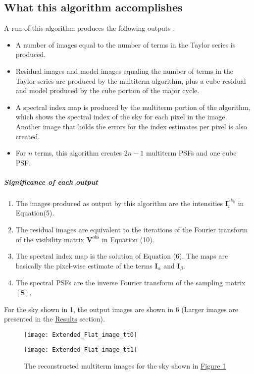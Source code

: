 \documentclass{article}
\begin{document}
\subsection{What this algorithm accomplishes}
A run of this algorithm produces the following outputs : 
\begin{itemize}
\item A number of images equal to the number of terms in the Taylor series is produced.
\item Residual images and model images equaling the number of terms in the Taylor series are produced by the multiterm algorithm, plus a cube residual and model produced by the cube portion of the major cycle.
\item A spectral index map is produced by the multiterm portion of the algorithm, which shows the spectral index of the sky for each pixel in the image. Another image that holds the errors for the index estimates per pixel is also created. 
\item For $n$ terms, this algorithm creates $2n-1$ multiterm PSFs and one cube PSF.
\end{itemize}
\subparagraph{Significance of each output}
\begin{enumerate}
\item The images produced as output by this algorithm are the intensities $\textbf{I}^{sky}_t$ in Equation(5).
\item The residual images are equivalent to the iterations of the Fourier transform of the visibility matrix $\textbf{V}^{obs}$ in Equation (10).
\item The spectral index map is the solution of Equation (6). The maps are basically the pixel-wise estimate of the terms $\textbf{I}_\alpha$ and $\textbf{I}_\beta$. 
\item The spectral PSFs are the inverse Fourier transform of the sampling matrix $[\textbf{S}]$.
\end{enumerate}
For the sky shown in \figurename{ 1}, the output images are shown in \figurename{ 6} (Larger images are presented in the \hyperref[section3]{Results} section).
\begin{figure}
\centering
\begin{minipage}[b]{.5\textwidth}
\texttt{[image: Extended\_Flat\_image\_tt0]}
\end{minipage}%
\begin{minipage}[b]{.55\linewidth}
\texttt{[image: Extended\_Flat\_image\_tt1]}
\end{minipage}
\caption{The reconstructed multiterm images for the sky shown in \hyperref[ 1]{Figure 1}}
\label{7}
\end{figure}
\end{document}
